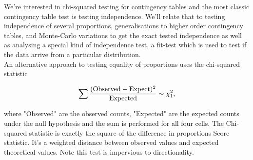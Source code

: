 \documentclass{homework}
\begin{document}
We're interested in chi-squared testing for contingency tables and the most classic contingency table test is testing independence. We'll relate that to testing independence of several proportions, generalisations to higher order contingency tables, and Monte-Carlo variations to get the exact tested independence as well as analysing a special kind of independence test, a fit-test which is used to test if the data arrive from a particular distribution. \\

An alternative approach to testing equality of proportions uses the chi-squared statistic

$$
\sum \frac{(\textnormal{Observed}-\textnormal{Expect})^2}{\textnormal{Expected}} \sim \chi^2_{1},
$$

where "Observed" are the observed counts, "Expected" are the expected counts under the null hypothesis and the sum is performed for all four cells. The Chi-squared statistic is exactly the square of the difference in proportions Score statistic. It's a weighted distance between observed values and expected theoretical values. Note this test is impervious to directionality. 
\end{document}
